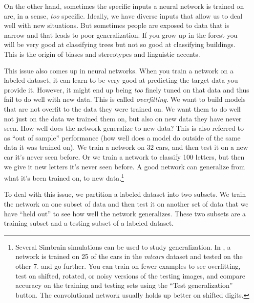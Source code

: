 On the other hand, sometimes the specific inputs a neural network is trained on are, in a sense, \emph{too} specific. Ideally, we have diverse inputs that allow us to deal well with new situations. But sometimes people are exposed to  data that is narrow and that leads to poor generalization. If you grow up in the forest you will be very good at classifying trees but not so good at classifying buildings. This is the origin of biases and stereotypes and linguistic accents. 

This issue also comes up in neural networks. When you train a network on a labeled dataset, it can learn to be very good at predicting the target data you provide it. However, it might end up being \emph{too} finely tuned on that data and thus fail to do well with new data. This is called \emph{overfitting}. We want to build models that are not overfit to the data they were trained on. We want them to do well not just on the data we trained them on, but also on new data they have never seen. How well does the network generalize to new data?  This is also referred to as ``out of sample'' performance (how well does a model do outside of the same data it was trained on). We train a network on 32 cars, and then test it on a new car it's never seen before. Or we train a network to classify 100 letters, but then we give it new letters it's never seen before. A good network can generalize from what it's been trained on, to new data.\footnote{Several Simbrain simulations can be used to study generalization. In , a network is trained on 25 of the cars in the \emph{mtcars} dataset and tested on the other 7.  and  go further. You can train on fewer examples to see overfitting, test on shifted, rotated, or noisy versions of the testing images, and compare accuracy on the training and testing sets using the ``Test generalization'' button. The convolutional network usually holds up better on shifted digits.}

To deal with this issue, we partition a labeled dataset into two subsets. We train the network on one subset of data and then test it on another set of data that we have ``held out'' to see how well the network generalizes. These two subsets are a training subset and a testing subset of a labeled dataset.

